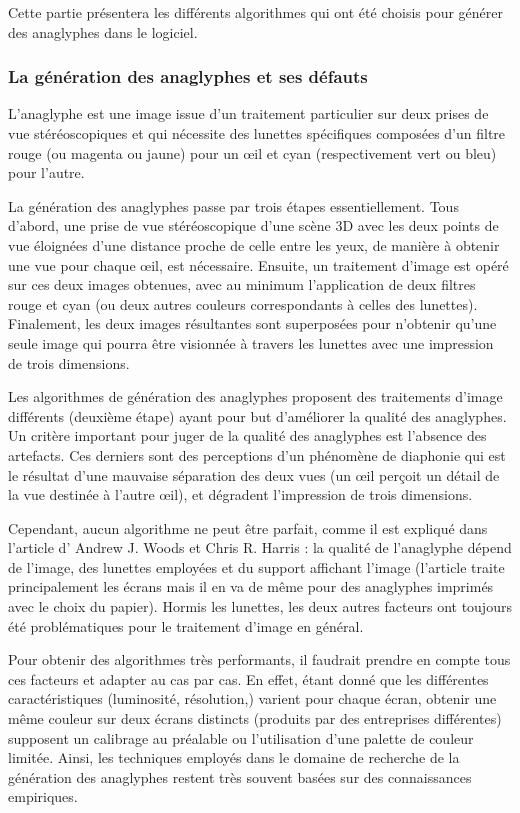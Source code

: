 Cette partie présentera les différents algorithmes qui ont été choisis pour générer des anaglyphes dans le logiciel.

\subsubsection{La génération des anaglyphes et ses défauts}
	L'anaglyphe est une image issue d'un traitement particulier sur deux prises de vue stéréoscopiques et qui nécessite des lunettes spécifiques composées d'un filtre rouge (ou magenta ou jaune) pour un \oe il et cyan (respectivement vert ou bleu) pour l'autre. 
	
	La génération des anaglyphes passe par trois étapes essentiellement. Tous d'abord, une prise de vue stéréoscopique d'une scène 3D avec les deux points de vue éloignées d'une distance proche de celle entre les yeux, de manière à obtenir une vue pour chaque \oe il, est nécessaire. Ensuite, un traitement d'image est opéré sur ces deux images obtenues, avec au minimum l'application de deux filtres rouge et cyan (ou deux autres couleurs correspondants à celles des lunettes). Finalement, les deux images résultantes sont superposées pour n'obtenir qu'une seule image qui pourra être visionnée à travers les lunettes avec une impression de trois dimensions.
	
	Les algorithmes de génération des anaglyphes proposent des traitements d'image différents (deuxième étape) ayant pour but d'améliorer la qualité des anaglyphes. Un critère important pour juger de la qualité des anaglyphes est l'absence des artefacts. Ces derniers sont des perceptions d'un phénomène de diaphonie qui est le résultat d'une mauvaise séparation des deux vues (un \oe il perçoit un détail de la vue destinée à l'autre \oe il), et dégradent l'impression de trois dimensions. %

	Cependant, aucun algorithme ne peut être parfait, comme il est expliqué dans l'article d' Andrew J. Woods et Chris R. Harris \cite{anaglypheDefaut}  : la qualité de l'anaglyphe dépend de l'image, des lunettes employées et du support affichant l'image (l'article traite principalement les écrans mais il en va de même pour des anaglyphes imprimés avec le choix du papier). Hormis les lunettes, les deux autres facteurs ont toujours été problématiques pour le traitement d'image en général.  
	
	Pour obtenir des algorithmes très performants, il faudrait prendre en compte tous ces facteurs et adapter au cas par cas. En effet, étant donné que les différentes caractéristiques (luminosité, résolution,) varient pour chaque écran, obtenir une même couleur sur deux écrans distincts (produits par des entreprises différentes) supposent un calibrage au préalable ou l'utilisation d'une palette de couleur limitée. Ainsi, les techniques employés dans le domaine de recherche de la génération des anaglyphes restent très souvent basées sur des connaissances empiriques.
		
